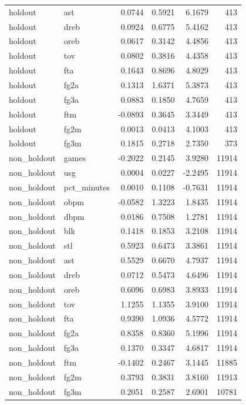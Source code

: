 \begin{table}
\begin{tabular}{llrrrr}
holdout & ast & 0.0744 & 0.5921 & 6.1679 & 413 \\
holdout & dreb & 0.0924 & 0.6775 & 5.4162 & 413 \\
holdout & oreb & 0.0617 & 0.3142 & 4.4856 & 413 \\
holdout & tov & 0.0802 & 0.3816 & 4.4358 & 413 \\
holdout & fta & 0.1643 & 0.8696 & 4.8029 & 413 \\
holdout & fg2a & 0.1313 & 1.6371 & 5.3873 & 413 \\
holdout & fg3a & 0.0883 & 0.1850 & 4.7659 & 413 \\
holdout & ftm & -0.0893 & 0.3645 & 3.3449 & 413 \\
holdout & fg2m & 0.0013 & 0.0413 & 4.1003 & 413 \\
holdout & fg3m & 0.1815 & 0.2718 & 2.7350 & 373 \\
non\_holdout & games & -0.2022 & 0.2145 & 3.9280 & 11914 \\
non\_holdout & usg & 0.0004 & 0.0227 & -2.2495 & 11914 \\
non\_holdout & pct\_minutes & 0.0010 & 0.1108 & -0.7631 & 11914 \\
non\_holdout & obpm & -0.0582 & 1.3223 & 1.8435 & 11914 \\
non\_holdout & dbpm & 0.0186 & 0.7508 & 1.2781 & 11914 \\
non\_holdout & blk & 0.1418 & 0.1853 & 3.2108 & 11914 \\
non\_holdout & stl & 0.5923 & 0.6473 & 3.3861 & 11914 \\
non\_holdout & ast & 0.5529 & 0.6670 & 4.7937 & 11914 \\
non\_holdout & dreb & 0.0712 & 0.5473 & 4.6496 & 11914 \\
non\_holdout & oreb & 0.6096 & 0.6983 & 3.8933 & 11914 \\
non\_holdout & tov & 1.1255 & 1.1355 & 3.9100 & 11914 \\
non\_holdout & fta & 0.9390 & 1.0936 & 4.5772 & 11914 \\
non\_holdout & fg2a & 0.8358 & 0.8360 & 5.1996 & 11914 \\
non\_holdout & fg3a & 0.1370 & 0.3347 & 4.6817 & 11914 \\
non\_holdout & ftm & -0.1402 & 0.2467 & 3.1445 & 11885 \\
non\_holdout & fg2m & 0.3793 & 0.3831 & 3.8160 & 11913 \\
non\_holdout & fg3m & 0.2051 & 0.2587 & 2.6901 & 10781 \\
\bottomrule
\end{tabular}
\end{table}
